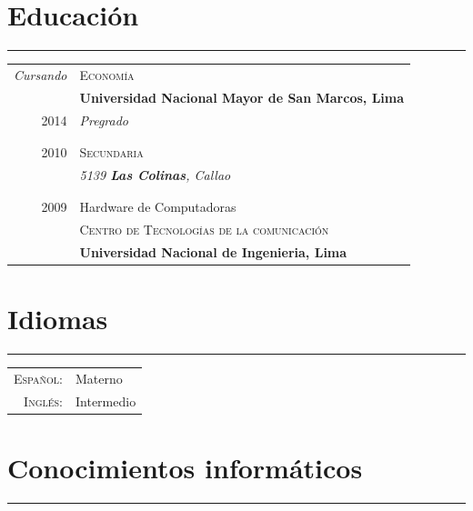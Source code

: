 \documentclass[a4paper,10pt]{article}
\newcommand{\tvspace}{\footnotesize{}\\\multicolumn{2}{c}{}}
\begin{document}
\section{Educación}
\hrule
	\begin{tabular}{r|p{11cm}}
					\emph{Cursando}      & \textsc{Economía}\\
														   & \textbf{Universidad Nacional Mayor de San Marcos, Lima} \\
					\textsc{2014}        & \emph{Pregrado}\\
 	                             & \tvspace \\

					\textsc{2010}        & \textsc{Secundaria} \\
														   & \emph{5139 \textbf{Las Colinas}, Callao} \\
                               & \tvspace \\

					\textsc{2009}        & Hardware de Computadoras\\
														   & \textsc{Centro de Tecnologías de la comunicación}\\
														   & \textbf{Universidad Nacional de Ingenieria, Lima}
	\end{tabular}


\section{Idiomas}
\hrule
	\begin{tabular}{rl}
 		\textsc{Español:} & Materno\\
 		\textsc{Inglés:}  & Intermedio\\
	\end{tabular}

\section{Conocimientos informáticos}
\hrule
\end{document}
